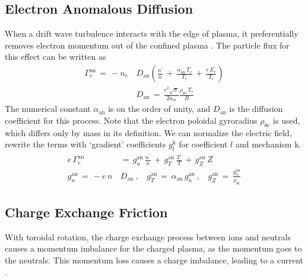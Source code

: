 \subsection{Electron Anomalous Diffusion}\label{ssec:an_diffusion}
When a drift wave turbulence interacts with the edge of plasma, it preferentially removes electron momentum out of the confined plasma \cite{itoh_model_1988} \cite{stringer_non-ambipolar_1995}.
The particle flux for this effect can be written as
\begin{align} %
	\Gamma_e^\text{an} \,=\, -n_e \, &D_\text{an} \left(\frac{n^\prime}{n} \,+\,
		\frac{\alpha_\text{an}\,T_e^\prime}{T_e} \,+\, \frac{e\,E_r}{T_e}\right)
		\label{eq:Gamma_an_orig} \\
	&D_\text{an} \,=\, \frac{\epsilon^2 \sqrt{\pi}}{2 a_m}
		\frac{\rho_{\theta e} \, T_e}{B} \label{eq:D_an}
\end{align}
The numerical constant $\alpha_\text{an}$ is on the order of unity, and $D_\text{an}$ is the diffusion coefficient for this process.
Note that the electron poloidal gyroradius $\rho_{\theta e}$ is used, which differs only by mass in its definition.
We can normalize the electric field, rewrite the terms with `gradient' coefficients $g_l^\text{k}$ for coefficient $l$ and mechanism $\text{k}$.
\begin{align} %
	e\,\Gamma_e^\text{an} \,&=\, g_n^\text{an}\,\frac{n^\prime}{n} \,+\,
		g_T^\text{an}\,\frac{T^\prime}{T} \,+\,
		g_Z^\text{an}\,Z \label{eq:Gamma_an_g} \\
	g_n^\text{an} \,=\, -e \, n \, &D_\text{an}~,~~~~
		g_T^\text{an} \,=\, \alpha_\text{an} \, g_n^\text{an}~,~~~~
		g_Z^\text{an} \,=\, \frac{g_n^\text{an}}{\rho_{\theta i}}
		\label{eq:g_an}
\end{align}


\subsection{Charge Exchange Friction}\label{ssec:cx_friction}
With toroidal rotation, the charge exchange process between ions and neutrals causes a momentum imbalance for the charged plasma, as the momentum goes to the neutrals.
This momentum loss causes a charge imbalance, leading to a current \cite{toda_theoretical_1997}.

